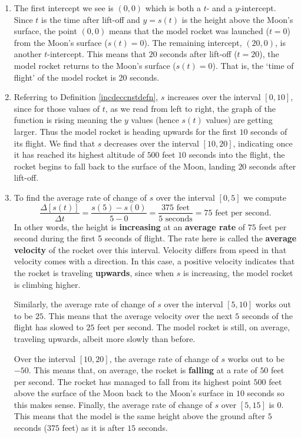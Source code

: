 \documentclass{ximera}
\begin{document}
\begin{example}
\begin{explanation}
\begin{enumerate}
\item The first intercept we see is $(0, 0)$ which is both a $t$- and a $y$-intercept.  Since $t$ is the time after lift-off and $y = s(t)$ is  the height above the Moon's surface, the point $(0, 0)$ means that the model rocket was launched ($t=0$) from the Moon's surface ($s(t) = 0$).  The remaining intercept, $(20, 0)$,  is another $t$-intercept.  This means that $20$ seconds after lift-off ($t=20$), the model rocket returns to the Moon's surface ($s(t) = 0$).   That is, the `time of flight' of the model rocket is 20 seconds.

\item  Referring to Definition \ref{incdeccnstdefn}, $s$ increases over the interval $[0, 10]$, since for those values of $t$, as we read from left to right, the graph of the function is rising meaning the $y$ values (hence $s(t)$ values) are getting larger. Thus the model rocket is heading upwards for the first $10$ seconds of its flight.  We find that $s$ decreases over the interval $[10, 20]$, indicating once it has reached its highest altitude of $500$ feet $10$ seconds into the flight, the rocket begins to fall back to the surface of the Moon, landing $20$ seconds after lift-off.

\item  To find the average rate of change of $s$ over the interval $[0, 5]$ we compute \[ \frac{\Delta[s(t)]}{\Delta t} = \frac{s(5) - s(0)}{5 - 0} = \frac{\text{$375$ feet}}{\text{$5$ seconds}} = \text{$75$ feet per second}.\] In other words, the height is \textbf{increasing} at an \textbf{average rate} of $75$ feet per second during the first 5 seconds of flight.  The rate here is called the  \textbf{average velocity} of the rocket over this interval.  Velocity differs from speed in that velocity comes with a direction.  In this case, a positive velocity indicates that the rocket is traveling \textbf{upwards}, since when $s$ is increasing, the model rocket is climbing higher.  



Similarly, the average rate of change of $s$ over the interval $[5, 10]$ works out to be $25$.  This means that the average velocity over the next $5$ seconds of the flight has slowed to $25$ feet per second. The model rocket is still, on average, traveling upwards, albeit more slowly than before.  



Over the interval $[10, 20]$, the average rate of change of $s$ works out to be $-50$.  This means that, on average, the rocket is \textbf{falling} at a rate of $50$ feet per second.  The rocket has managed to fall from its highest point $500$ feet above the surface of the Moon back to the Moon's surface in $10$ seconds so this makes sense. Finally, the average rate of change of $s$ over $[5, 15]$ is $0$.  This means that the model is the same height above the ground after $5$ seconds ($375$ feet) as it is after $15$ seconds.    




\end{enumerate}
\end{explanation}
\end{example}
\end{document}
